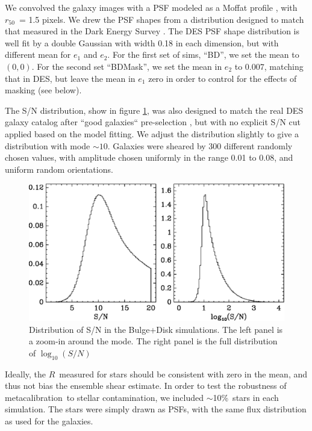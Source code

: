 \documentclass[usegraphicx,usenatbib]{mn2e}
\newcommand{\hlr}{$r_{50}$}
\newcommand{\mcal}{metacalibration}
\newcommand{\mcalR}{$R$}
\newcommand{\nsimNstarperc}{10\%}
\begin{document}
We convolved the galaxy images with a PSF modeled as a Moffat profile
\citep{Moffat1969}, with \hlr\ = 1.5 pixels.  We drew the PSF shapes from a
distribution designed to match that measured in the Dark Energy Survey
\citep[][(DES)]{DESSVShear}.  The DES PSF shape distribution is well fit by a
double Gaussian with width 0.18 in each dimension, but with different mean for
$e_1$ and $e_2$.  For the first set of sims, ``BD'', we set the mean to
$(0,0)$.  For the second set ``BDMask'', we set the mean in $e_2$ to $0.007$,
matching that in DES, but leave the mean in $e_1$ zero in order to control for
the effects of masking (see below).

The S/N distribution, show in figure \ref{fig:s2n}, was also designed to match
the real DES galaxy catalog after ``good galaxies`` pre-selection
\citep{DESSVShear}, but with no explicit S/N cut applied based on the model
fitting. We adjust the distribution slightly to give a distribution with
mode $\sim10$.  Galaxies were sheared by 300 different randomly chosen
values, with amplitude chosen uniformly in the range 0.01 to 0.08, and uniform
random orientations.

\begin{figure}
    \centering
    \includegraphics[scale=0.45]{run-bd21mcal-dt01-s2n-hist.eps}

    \caption{Distribution of S/N in the Bulge+Disk simulations. The
    left panel is a zoom-in around the mode.  The right panel is
the full distribution of $\log_{10}(S/N)$}

\label{fig:s2n}
\end{figure}


Ideally, the \mcalR\ measured for stars should be consistent with zero in the
mean, and thus not bias the ensemble shear estimate.  In order to test the
robustness of \mcal\ to stellar contamination, we included $\sim$\nsimNstarperc\ stars
in each simulation.  The stars were simply drawn as PSFs, with the same flux
distribution as used for the galaxies.
\end{document}
